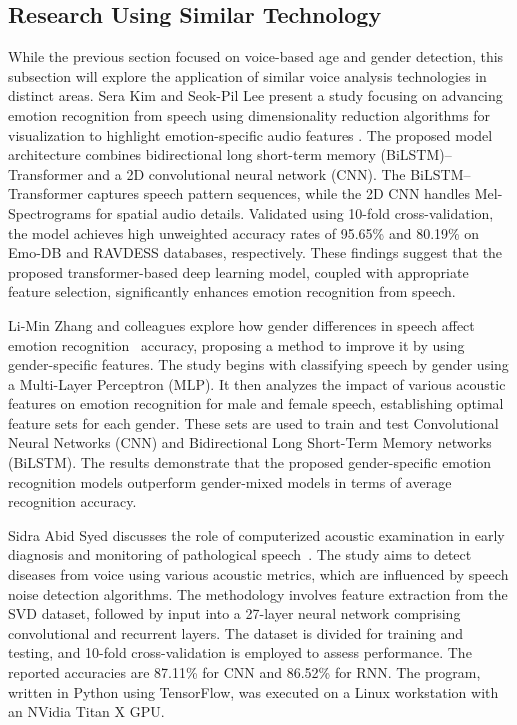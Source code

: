 \documentclass[conference, 10pt,onecolumn]{IEEEtran}
\begin{document}
\subsection{Research Using Similar Technology}
While the previous section focused on voice-based age and gender detection, this subsection will explore the application of similar voice analysis technologies in distinct areas. Sera Kim and Seok-Pil Lee present a study focusing on advancing emotion recognition from speech using dimensionality reduction algorithms for visualization to highlight emotion-specific audio features \cite{kim2023bilstm}. The proposed model architecture combines bidirectional long short-term memory (BiLSTM)–Transformer and a 2D convolutional neural network (CNN). The BiLSTM–Transformer captures speech pattern sequences, while the 2D CNN handles Mel-Spectrograms for spatial audio details. Validated using 10-fold cross-validation, the model achieves high unweighted accuracy rates of 95.65\% and 80.19\% on Emo-DB and RAVDESS databases, respectively. These findings suggest that the proposed transformer-based deep learning model, coupled with appropriate feature selection, significantly enhances emotion recognition from speech.

Li-Min Zhang and colleagues explore how gender differences in speech affect emotion recognition~\cite{zhang2023deep} accuracy, proposing a method to improve it by using gender-specific features. The study begins with classifying speech by gender using a Multi-Layer Perceptron (MLP). It then analyzes the impact of various acoustic features on emotion recognition for male and female speech, establishing optimal feature sets for each gender. These sets are used to train and test Convolutional Neural Networks (CNN) and Bidirectional Long Short-Term Memory networks (BiLSTM). The results demonstrate that the proposed gender-specific emotion recognition models outperform gender-mixed models in terms of average recognition accuracy.

Sidra Abid Syed discusses the role of computerized acoustic examination in early diagnosis and monitoring of pathological speech~\cite{syed2021comparative}. The study aims to detect diseases from voice using various acoustic metrics, which are influenced by speech noise detection algorithms. The methodology involves feature extraction from the SVD dataset, followed by input into a 27-layer neural network comprising convolutional and recurrent layers. The dataset is divided for training and testing, and 10-fold cross-validation is employed to assess performance. The reported accuracies are 87.11\% for CNN and 86.52\% for RNN. The program, written in Python using TensorFlow, was executed on a Linux workstation with an NVidia Titan X GPU.
\end{document}
